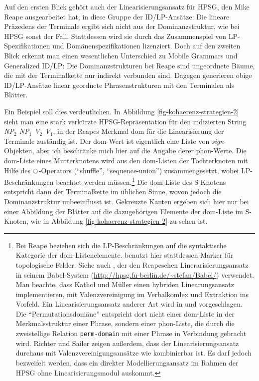 Auf den ersten Blick gehört auch der Linearisierungsansatz für HPSG, den Mike Reape \citep{Reape:92,Reape:94,Reape:96} ausgearbeitet hat, in diese Gruppe der ID/LP-Ansätze: Die lineare Präzedens der Terminale ergibt sich nicht aus der Dominanzstruktur, wie bei HPSG sonst der Fall. Stattdessen wird sie durch das Zusammenspiel von LP-Spezifikationen und Domänenspezifikationen lizenziert. Doch auf den zweiten Blick erkennt man einen wesentlichen Unterschied zu Mobile Grammars und Generalized ID/LP: Die Dominanzstrukturen bei Reape sind ungeordnete Bäume, die mit der Terminalkette nur indirekt verbunden sind. Dagegen generieren obige ID/LP-Ansätze linear geordnete Phrasenstrukturen mit den Terminalen als Blätter. 

Ein Beispiel soll dies verdeutlichen. In Abbildung \ref{fig-kohaerenz-strategien-2} sieht man eine stark verkürzte HPSG-Repräsentation für den indizierten String {\it NP$_2$ NP$_1$ V$_2$ V$_1$}, in der Reapes Merkmal {\sc dom} für die Linearisierung der Terminale zuständig ist. Der {\sc dom}-Wert ist eigentlich eine Liste von {\it sign}-Objekten, aber ich beschränke mich hier auf die Angabe derer {\sc phon}-Werte. Die {\sc dom}-Liste eines Mutterknotens wird aus den {\sc dom}-Listen der Tochterknoten mit Hilfe des $\ocircle$-Operators ("`shuffle"', "`sequence-union"') zusammengesetzt, wobei LP-Beschränkungen beachtet werden müssen.\footnote{Bei Reape beziehen sich die LP-Beschränkungen auf die syntaktische Kategorie der {\sc dom}-Listenelemente. \cite{Kathol:95,Kathol:00} benutzt hier stattdessen Marker für topologische Felder. Siehe auch \cite{Mueller:96,Mueller:99,Mueller:02,Mueller:04}, der den Reapeschen Linerarisierungsansatz in seinem Babel-System (\url{http://hpsg.fu-berlin.de/~stefan/Babel/}) verwendet. Man beachte, dass Kathol und Müller einen hybriden Linearungsansatz implementieren, mit  Valenzvereinigung im Verbalkomlex und Extraktion ins Vorfeld. Ein Linearisierungsansatz anderer Art wird in \cite{Richter:Sailer:95} und \cite{Richter:97} vorgeschlagen. Die "`Permutationsdomäne"'  entspricht dort nicht einer {\sc dom}-Liste in der Merkmalsstruktur einer Phrase, sondern einer {\sc phon}-Liste, die durch die zweistellige Relation {\tt perm-domain} mit einer Phrase in Verbindung gebracht wird. Richter und Sailer zeigen au\ss erdem, dass der Linearisierungsansatz durchaus mit Valenzvereinigungsansätze wie \cite{Hinrichs:Nakazawa:94} kombinierbar ist. Es darf jedoch bezweifelt werden, dass ein direkter Modellierungsansatz im Rahmen der HPSG ohne Linearisierungsmodul auskommt.} Die {\sc dom}-Liste des S-Knotens entspricht dann der Terminalkette im üblichen Sinne, wovon jedoch die Dominanzstruktur unbeeinflusst ist. Gekreuzte Kanten ergeben sich hier nur bei einer Abbildung der Blätter auf die dazugehörigen Elemente der {\sc dom}-Liste im S-Knoten, wie in Abbildung \ref{fig-kohaerenz-strategien-2} zu sehen ist.   

